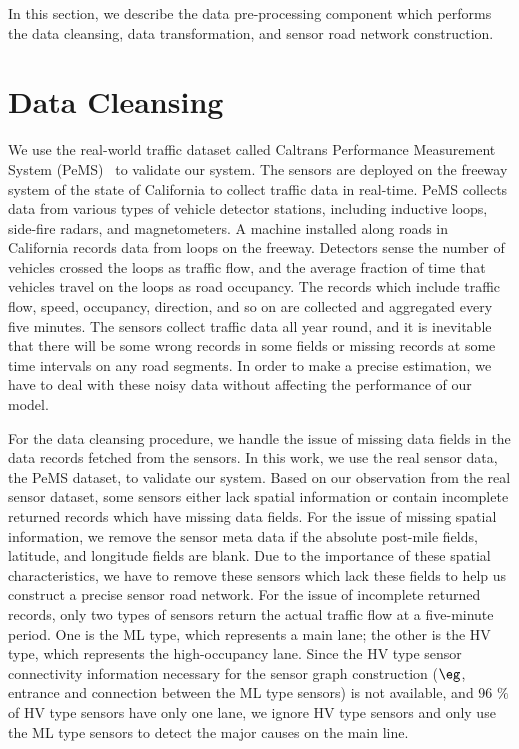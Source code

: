 In this section, we describe the data pre-processing component which performs the data cleansing, data transformation, and sensor road network construction.

\section{Data Cleansing} \label{subsubsec:dc} 

We use the real-world traffic dataset called Caltrans Performance Measurement System (PeMS)~\cite{pemsdataset} to validate our system. The sensors are deployed on the freeway system of the state of California to collect traffic data in real-time. 
PeMS collects data from various types of vehicle detector stations, including inductive loops, side-fire radars, and magnetometers. A machine installed along roads in California records data from loops on the freeway. Detectors sense the number of vehicles crossed the loops as traffic flow, and the average fraction of time that vehicles travel on the loops as road occupancy. 
The records which include traffic flow, speed, occupancy, direction, and so on are collected and aggregated every five minutes. 
The sensors collect traffic data all year round, and it is inevitable that there will be some wrong records in some fields or missing records at some time intervals on any road segments. In order to make a precise estimation, we have to deal with these noisy data without affecting the performance of our model. 

For the data cleansing procedure, we handle the issue of missing data fields in the data records fetched from the sensors. In this work, we use the real sensor data, the PeMS dataset, to validate our system. Based on our observation from the real sensor dataset, some sensors either lack spatial information or contain incomplete returned records which have missing data fields. 
For the issue of missing spatial information, we remove the sensor meta data if the absolute post-mile fields, latitude, and longitude fields are blank. Due to the importance of these spatial characteristics, we have to remove these sensors which lack these fields to help us construct a precise sensor road network. For the issue of incomplete returned records, only two types of sensors return the actual traffic flow at a five-minute period. One is the ML type, which represents a main lane; the other is the HV type, which represents the high-occupancy lane. Since the HV type sensor connectivity information necessary for the sensor graph construction ($\eg$, entrance and connection between the ML type sensors) is not available, and 96 $\%$ of HV type sensors have only one lane, we ignore HV type sensors and only use the ML type sensors to detect the major causes on the main line.


